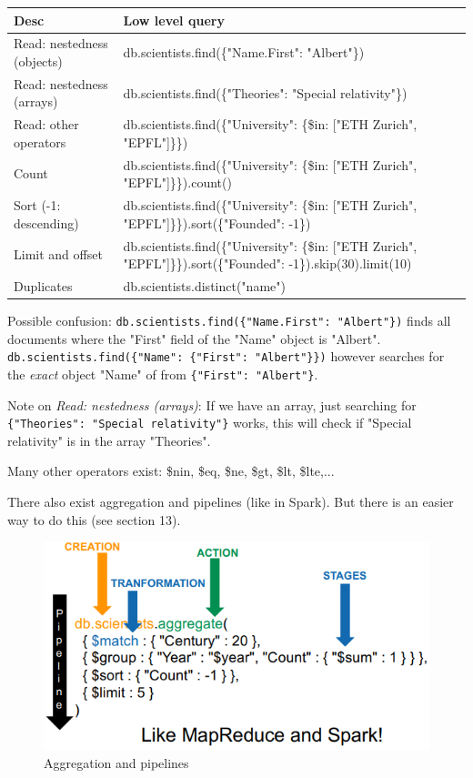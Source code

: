 \documentclass[11pt,oneside,a4paper]{article}
\begin{document}
\begin{table}[hb!]
\centering
\begin{tabular}{|p{40mm}|p{135mm}|}
	\hline 
	Desc & Low level query \\ 
	\hline 
	Read: nestedness (objects) & db.scientists.find(\{"Name.First": "Albert"\}) \\ 
	\hline 
	Read: nestedness (arrays) & db.scientists.find(\{"Theories": "Special relativity"\}) \\ 
	\hline 
	Read: other operators & db.scientists.find(\{"University": \{\$in: ["ETH Zurich", "EPFL"]\}\}) \\ 
	\hline 
	Count & db.scientists.find(\{"University": \{\$in: ["ETH Zurich", "EPFL"]\}\}).count() \\ 
	\hline 
	Sort (-1: descending) & db.scientists.find(\{"University": \{\$in: ["ETH Zurich", "EPFL"]\}\}).sort(\{"Founded": -1\}) \\ 
	\hline 
	Limit and offset & db.scientists.find(\{"University": \{\$in: ["ETH Zurich", "EPFL"]\}\}).sort(\{"Founded": -1\}).skip(30).limit(10) \\ 
	\hline 
	Duplicates & db.scientists.distinct("name") \\ 
	\hline 
\end{tabular} 
\end{table}

Possible confusion: \texttt{db.scientists.find(\{"Name.First": "Albert"\})} finds all documents where the "First" field of the "Name" object is "Albert". \texttt{db.scientists.find(\{"Name": \{"First": "Albert"\}\})} however searches for the \textit{exact} object "Name" of from \texttt{\{"First": "Albert"\}}.

Note on \textit{Read: nestedness (arrays)}: If we have an array, just searching for \texttt{\{"Theories": "Special relativity"\}} works, this will check if "Special relativity" is in the array "Theories".

Many other operators exist: \$nin, \$eq, \$ne, \$gt, \$lt, \$lte,...

There also exist aggregation and pipelines (like in Spark). But there is an easier way to do this (see section 13).

\begin{figure}[b!]
	\centering
	\includegraphics[width=0.4\linewidth]{figures/docstores_aggregation_pipeline}
	\caption{Aggregation and pipelines}
	\label{fig:docstoresaggregationpipeline}
\end{figure}
\end{document}
